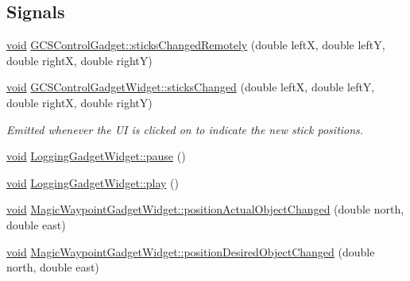 \subsection*{\-Signals}
\begin{DoxyCompactItemize}
\item 
\hyperlink{group___u_a_v_objects_plugin_ga444cf2ff3f0ecbe028adce838d373f5c}{void} \hyperlink{group___g_c_s_control_gadget_plugin_gadf32420d5e7ad8ff1d32752209406e28}{\-G\-C\-S\-Control\-Gadget\-::sticks\-Changed\-Remotely} (double left\-X, double left\-Y, double right\-X, double right\-Y)
\item 
\hyperlink{group___u_a_v_objects_plugin_ga444cf2ff3f0ecbe028adce838d373f5c}{void} \hyperlink{group___g_c_s_control_gadget_plugin_gacad03ad4b99da2390b6a712a475b4987}{\-G\-C\-S\-Control\-Gadget\-Widget\-::sticks\-Changed} (double left\-X, double left\-Y, double right\-X, double right\-Y)
\begin{DoxyCompactList}\small\item\em \-Emitted whenever the \-U\-I is clicked on to indicate the new stick positions. \end{DoxyCompactList}\item 
\hyperlink{group___u_a_v_objects_plugin_ga444cf2ff3f0ecbe028adce838d373f5c}{void} \hyperlink{group___g_c_s_control_gadget_plugin_gab36252efc1545bad1c46720b2fd92a22}{\-Logging\-Gadget\-Widget\-::pause} ()
\item 
\hyperlink{group___u_a_v_objects_plugin_ga444cf2ff3f0ecbe028adce838d373f5c}{void} \hyperlink{group___g_c_s_control_gadget_plugin_gabd0c6db2a3fecf6afb525d40bc12431c}{\-Logging\-Gadget\-Widget\-::play} ()
\item 
\hyperlink{group___u_a_v_objects_plugin_ga444cf2ff3f0ecbe028adce838d373f5c}{void} \hyperlink{group___g_c_s_control_gadget_plugin_gabd9554a73e1a5f9370d4aefabc29cc96}{\-Magic\-Waypoint\-Gadget\-Widget\-::position\-Actual\-Object\-Changed} (double north, double east)
\item 
\hyperlink{group___u_a_v_objects_plugin_ga444cf2ff3f0ecbe028adce838d373f5c}{void} \hyperlink{group___g_c_s_control_gadget_plugin_ga923489d0d3e251a031fdc66ce20d411b}{\-Magic\-Waypoint\-Gadget\-Widget\-::position\-Desired\-Object\-Changed} (double north, double east)
\end{DoxyCompactItemize}
